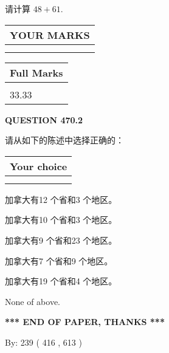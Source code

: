 \documentclass{ctexart}
\begin{document}
  
 
请计算 $ %
48 +  %
61 $.
 

 

 
  
\vspace{0.2in}
  
\noindent\begin{tabular}{|l|}
\hline
 YOUR MARKS  \\
\hline
 \\ 
 \\ 
\hline
\end{tabular}
\hspace{0.05in} \begin{tabular}{|l|}
\hline
 Full Marks  \\
\hline
 \\ 
33.33 \\
\hline
\end{tabular}
{\textbf{\Large{QUESTION
470.2 
}}}
  
  
请从如下的陈述中选择正确的：
  
  
\noindent\hspace{3.0in} \begin{tabular}{|l|}
\hline
Your choice \\
\hline
 \\ 
 \\ 
\hline
\end{tabular}
  
  
 
 
加拿大有12 个省和3 个地区。
 
 
加拿大有10 个省和3 个地区。
 
 
加拿大有9 个省和23 个地区。
 
 
加拿大有7 个省和9 个地区。
 
 
加拿大有19 个省和4 个地区。
 
 
 None of above.
 
 
   
   
 \vspace{0.2in}
 
   
   
   
   
\vspace{1.0in} 
{\textbf{\large{ *** END OF PAPER, THANKS *** }}} 
   
   
\hspace{1.0in} By: 
 239 ( 416 ,  613 )
   
\end{document}
